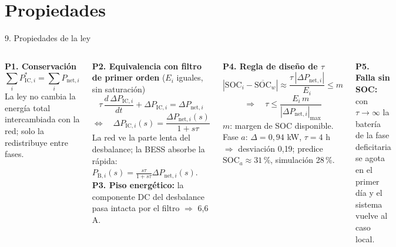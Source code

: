 \documentclass[aspectratio=169,11pt]{beamer}
\newcommand{\Pic}[1]{P_{\mathrm{IC},#1}}
\newcommand{\Picr}[1]{P^{*}_{\mathrm{IC},#1}}
\newcommand{\Pnet}[1]{P_{\mathrm{net},#1}}
\newcommand{\Pbat}[1]{P_{\mathrm{B},#1}}
\newcommand{\SOC}[1]{\mathrm{SOC}_{#1}}
\newcommand{\SOCw}{\overline{\mathrm{SOC}}_{w}}
\begin{document}
\section{Propiedades}
\begin{frame}{9. Propiedades de la ley}
  \footnotesize
  \begin{columns}[T]
    \textbf{P1. Conservación}
    \[\textstyle\sum_i \Picr{i}=\sum_i \Pnet{i}\]
    {\footnotesize La ley no cambia la energía total intercambiada con la red; solo la redistribuye entre fases.}

    \vspace{4pt}
    \textbf{P2. Equivalencia con filtro de primer orden} {\footnotesize($E_i$ iguales, sin saturación)}
    \begin{equation}
      \tau\,\frac{d\,\Delta\Pic{i}}{dt}+\Delta\Pic{i}=\Delta\Pnet{i}
    \end{equation}
    \vspace{-10pt}
    \[\Leftrightarrow\quad \Delta\Pic{i}(s)=\frac{\Delta\Pnet{i}(s)}{1+s\tau}\]
    {\footnotesize La red ve la parte lenta del desbalance; la BESS absorbe la rápida: $\Pbat{i}(s)=\frac{s\tau}{1+s\tau}\Delta\Pnet{i}(s)$.}
    \textbf{P3. Piso energético:} la componente DC del desbalance pasa intacta por el filtro $\Rightarrow$ 6{,}6 A.

    \vspace{6pt}
    \textbf{P4. Regla de diseño de $\tau$}
    \[|\SOC{i}-\SOCw|\approx\frac{\tau\,|\Delta\Pnet{i}|}{E_i}\le m\]
    \vspace{-6pt}
    \[\Rightarrow\quad \tau\le\frac{E_i\,m}{|\Delta\Pnet{i}|_{\max}}\]
    {\footnotesize $m$: margen de SOC disponible. Fase $a$: $\Delta=0{,}94$ kW, $\tau=4$ h $\Rightarrow$ desviación 0{,}19; predice $\SOC{a}\approx31\,\%$, simulación 28\,\%.}

    \vspace{6pt}
    \textbf{P5. Falla sin SOC:} con $\tau\to\infty$ la batería de la fase deficitaria se agota en el primer día y el sistema vuelve al caso local.
  \end{columns}
\end{frame}

\end{document}
